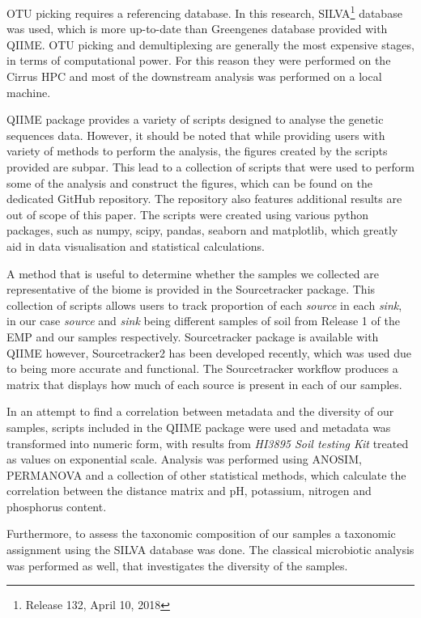 \documentclass[12pt,twocolumn]{article} %
\begin{document}
\par 
OTU picking requires a referencing database. In this research, SILVA\footnote{Release 132, April 10, 2018}\cite{Quast2012} database was used, which is more up-to-date than Greengenes\cite{McDonald2012} database provided with QIIME. OTU picking and demultiplexing are generally the most expensive stages, in terms of computational power. For this reason they were performed on the Cirrus HPC and most of the downstream analysis was performed on a local machine. 
\par
QIIME package provides a variety of scripts designed to analyse the genetic sequences data. However, it should be noted that while providing users with variety of methods to perform the analysis, the figures created by the scripts provided are subpar. This lead to a collection of scripts that were used to perform some of the analysis and construct the figures, which can be found on the dedicated GitHub repository\cite{Anonymous2018}. The repository also features additional results are out of scope of this paper. The scripts were created using various python packages, such as numpy, scipy, pandas, seaborn and matplotlib, which greatly aid in data visualisation and statistical calculations.
\par
A method that is useful to determine whether the samples we collected are representative of the biome is provided in the Sourcetracker package\cite{Knights2011}. This collection of scripts allows users to track proportion of each \textit{source} in each \textit{sink}, in our case \textit{source} and \textit{sink} being different samples of soil from Release 1 of the EMP and our samples respectively. Sourcetracker package is available with QIIME however, Sourcetracker2 has been developed recently, which was used due to being more accurate and functional. 
The Sourcetracker workflow produces a matrix that displays how much of each source is present in each of our samples.
\par
In an attempt to find a correlation between metadata and the diversity of our samples, scripts included in the QIIME package were used and metadata was transformed into numeric form, with results from \textit{HI3895 Soil testing Kit} treated as values on exponential scale. Analysis was performed using ANOSIM\cite{CLARKE1993}, PERMANOVA\cite{Tang2016} and a collection of other statistical methods, which calculate the correlation between the distance matrix and pH, potassium, nitrogen and phosphorus content.
\par
Furthermore, to assess the taxonomic composition of our samples a taxonomic assignment using the SILVA\cite{Quast2012} database was done. The classical microbiotic analysis was performed as well, that investigates the diversity of the samples.
%
%
\end{document}
